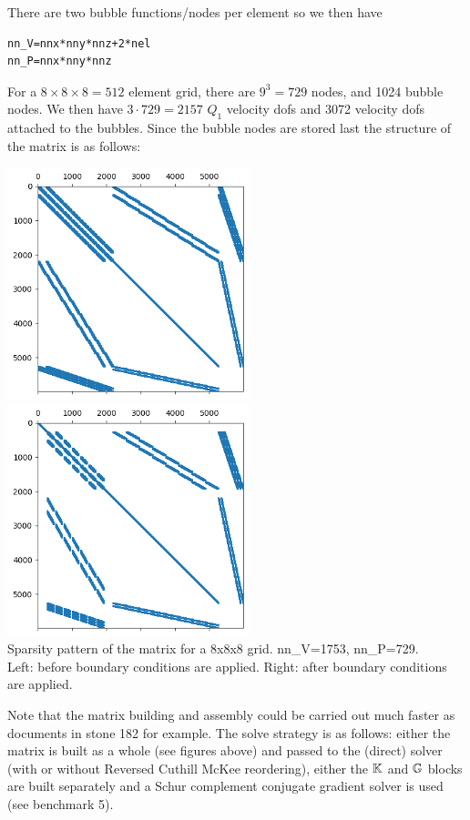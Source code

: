 There are two bubble functions/nodes per element so we then have 
\begin{lstlisting}
nn_V=nnx*nny*nnz+2*nel 
nn_P=nnx*nny*nnz
\end{lstlisting}
For a $8\times 8 \times 8=512$ element grid, there are $9^3=729$ nodes, and 1024 bubble nodes.
We then have $3\cdot 729=2157$ $Q_1$ velocity dofs and 3072 velocity dofs attached 
to the bubbles.
Since the bubble nodes are stored last the structure of the matrix is as follows:
\begin{center}
\includegraphics[width=7cm]{python_codes/fieldstone_82/RESULTS/matrix_8x8x8_bef_bc}
\includegraphics[width=7cm]{python_codes/fieldstone_82/RESULTS/matrix_8x8x8_aft_bc}\\
{\captionfont Sparsity pattern of the matrix for a 8x8x8 grid.
nn\_V=1753, nn\_P=729.\\ Left:
before boundary conditions are applied. 
Right: after boundary conditions are applied.} 
\end{center}

Note that the matrix building and assembly could be carried out 
much faster as documents in stone 182 for example.
The solve strategy is as follows: either the matrix is built 
as a whole (see figures above) and passed to the (direct) solver
(with or without Reversed Cuthill McKee reordering), 
either the ${\mathbb{K}}$ and ${\mathbb{G}}$ blocks are built separately and 
a Schur complement conjugate gradient solver is used (see benchmark 5). 

